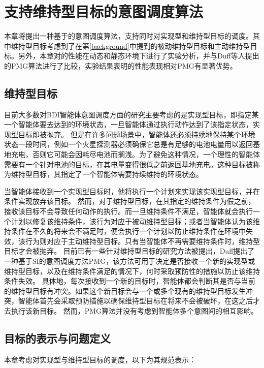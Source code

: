 \chapter{支持维持型目标的意图调度算法}\label{mg}
本章将提出一种基于\SA 的意图调度算法\SAM ，\SAM 支持同时对实现型和维持型目标的调度。其中维持型目标考虑到了在第\ref{background}中提到的被动维持型目标和主动维持型目标。另外，本章对\SAM 的性能在动态和静态环境下进行了实验分析，并与Duff等人提出的PMG\cite{DBLP:conf/atal/DuffHT06}算法进行了比较，实验结果表明\SAM 的性能表现相对PMG有显著优势。
\section{维持型目标}
目前大多数对BDI智能体意图调度方面的研究主要考虑的是实现型目标，即指定某一个智能体要去达到的环境状态，一旦智能体通过执行动作达到了该指定状态，实现型目标即被抛弃。
但是在许多问题场景中，智能体还必须持续地保持某个环境状态一段时间，例如一个火星探测器必须确保它总是有足够的电池电量用以返回基地充电，否则它可能会因耗尽电池而搁浅。为了避免这种情况，一个理性的智能体需要有一个针对电池的目标，在其电量变得很低之前返回基地充电。这种目标被称为维持型目标，其指定了一个智能体需要持续维持的环境状态。


当智能体接收到一个实现型目标时，他将执行一个计划来实现该实现型目标，并在条件实现放弃该目标。
%
然而，对于维持型目标，在其指定的维持条件为假之前，接收该目标不会导致任何动作的执行。而一旦维持条件不满足，智能体就会执行一个计划以修复该维持条件，该行为对应于被动维持型目标；或者当智能体认为该维持条件在不久的将来会不满足时，便会执行一个计划以防止维持条件在环境中失效，该行为则对应于主动维持型目标。只有当智能体不再需要维持条件时，维持型目标才会被抛弃。
目前已有一些针对维持型目标的研究方法被提出，Duff\cite{DBLP:conf/atal/DuffHT06}提出了一种基于SI的意图调度方法PMG，该方法可用于决定是否接收一个新的实现型或维持型目标，以及在维持条件满足的情况下，何时采取预防性的措施以防止该维持条件失效。
具体地，每次接收到一个新的目标时，智能体都会判断其是否与当前的维持型目标有冲突。如果这个新目标会与一个或多个现有的维持型目标发生冲突，智能体首先会采取预防措施以确保维持型目标在将来不会被破坏，在这之后才去执行该新目标。
然而，PMG算法并没有考虑到智能体多个意图间的相互影响。

\section{目标的表示与问题定义}
本章考虑对实现型与维持型目标的调度，以下为其规范表示：
